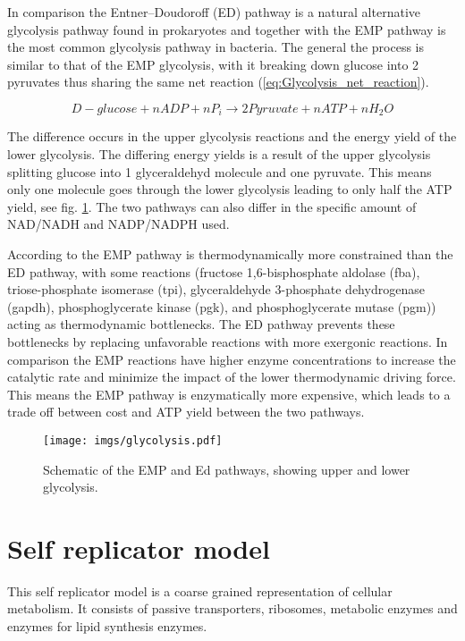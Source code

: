 In comparison the Entner–Doudoroff (ED) pathway is a natural alternative glycolysis pathway found in prokaryotes and together with the EMP pathway is the most common glycolysis pathway in bacteria. The general the process is similar to that of the EMP glycolysis, with it breaking down glucose into 2 pyruvates thus sharing the same net reaction (\ref{eq:Glycolysis_net_reaction}).

\begin{equation}
    D-glucose + n ADP + n P_i \rightarrow 2 Pyruvate + n ATP + n H_2O
    \label{eq:Glycolysis_net_reaction}
\end{equation}

The difference occurs in the upper glycolysis reactions and the energy yield of the lower glycolysis. The differing energy yields is a result of the upper glycolysis splitting glucose into 1 glyceraldehyd molecule and one pyruvate. This means only one molecule goes through the lower glycolysis leading to only half the ATP yield, see fig. \ref{fig:glycolysis_scheme}. 
The two pathways can also differ in the specific amount of NAD/NADH and NADP/NADPH used.

According to \cite{flamholz2012glycotic} the EMP pathway is thermodynamically more constrained than the ED pathway, with some reactions (fructose 1,6-bisphosphate aldolase (fba), triose-phosphate isomerase (tpi), glyceraldehyde 3-phosphate dehydrogenase (gapdh), phosphoglycerate kinase (pgk), and phosphoglycerate mutase (pgm)) acting as thermodynamic bottlenecks. The ED pathway prevents these bottlenecks by replacing unfavorable reactions with more exergonic reactions.
In comparison the EMP reactions have higher enzyme concentrations to increase the catalytic rate and minimize the impact of the lower thermodynamic driving force. This means the EMP pathway is enzymatically more expensive, which leads to a trade off between cost and ATP yield between the two pathways. 

\begin{figure}[H]
    \centering
    \texttt{[image: imgs/glycolysis.pdf]}
    \caption{Schematic of the EMP and Ed pathways, showing upper and lower glycolysis.}
    \label{fig:glycolysis_scheme}
\end{figure}

\section{Self replicator model}
This self replicator model is a coarse grained representation of cellular metabolism. It consists of passive transporters, ribosomes, metabolic enzymes and enzymes for lipid synthesis enzymes. 

